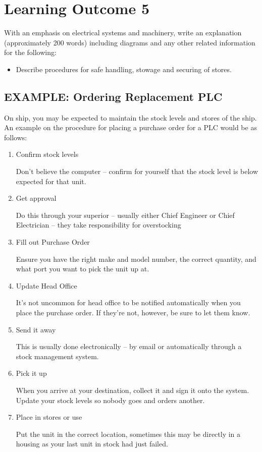 \documentclass[11pt,a4paper]{article}
\begin{document}
\section{Learning Outcome 5}
\begin{tcolorbox}[colback=red!5!white,colframe=red!75!black,title=\textbf{Demonstrate knowledge of handling of stores}]
With an emphasis on electrical systems and machinery, write an explanation (approximately 200 words) including diagrams and any other related information for the following:
\begin{itemize}
\item Describe procedures for safe handling, stowage and securing of stores.
\end{itemize}
\end{tcolorbox}
\subsection{EXAMPLE: Ordering Replacement PLC}
On ship, you may be expected to maintain the stock levels and stores of the ship. An example on the procedure for placing a purchase order for a PLC would be as follows:
\begin{enumerate}
\item Confirm stock levels

Don't believe the computer -- confirm for yourself that the stock level is below expected for that unit.
\item Get approval

Do this through your superior -- usually either Chief Engineer or Chief Electrician -- they take responsibility for overstocking
\item Fill out Purchase Order

Ensure you have the right make and model number, the correct quantity, and what port you want to pick the unit up at.
\item Update Head Office

It's not uncommon for head office to be notified automatically when you place the purchase order. If they're not, however, be sure to let them know.
\item Send it away

This is usually done electronically -- by email or automatically through a stock management system.
\item Pick it up

When you arrive at your destination, collect it and sign it onto the system. Update your stock levels so nobody goes and orders another.
\item Place in stores or use

Put the unit in the correct location, sometimes this may be directly in a housing as your last unit in stock had just failed.
\end{enumerate}
\newpage
\end{document}
